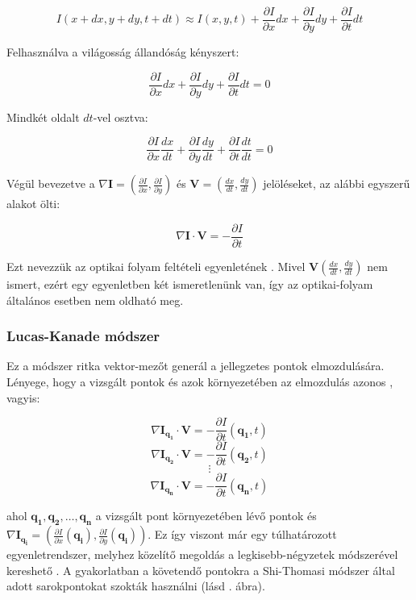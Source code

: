 \[I(x+dx, y+dy, t+dt) \approx I(x, y, t) + \frac{\partial I}{\partial x} dx + \frac{\partial I}{\partial y} dy + \frac{\partial I}{\partial t} dt\]

Felhasználva a világosság állandóság kényszert:

\[\frac{\partial I}{\partial x} dx + \frac{\partial I}{\partial y} dy + \frac{\partial I}{\partial t} dt = 0\]

Mindkét oldalt $dt$-vel osztva:

\[\frac{\partial I}{\partial x} \frac{dx}{dt} + \frac{\partial I}{\partial y} \frac{dy}{dt} + \frac{\partial I}{\partial t} \frac{dt}{dt} = 0\]

Végül bevezetve a $\nabla \mathbf{I} = \left(\frac{\partial I}{\partial x}, \frac{\partial I}{\partial y}\right)$ és $\mathbf{V} = \left(\frac{dx}{dt}, \frac{dy}{dt}\right)$ jelöléseket, az alábbi egyszerű alakot ölti:

\[\nabla \mathbf{I} \cdot \mathbf{V} = -\frac{\partial I}{\partial t}\]

Ezt nevezzük az optikai folyam feltételi egyenletének \cite{phd}. Mivel $\mathbf{V}\left(\frac{dx}{dt}, \frac{dy}{dt}\right)$ nem ismert, ezért egy egyenletben két ismeretlenünk van, így az optikai-folyam általános esetben nem oldható meg.

\subsubsection{Lucas-Kanade módszer \cite{LK}}

Ez a módszer ritka vektor-mezőt generál a jellegzetes pontok elmozdulására. Lényege, hogy a vizsgált pontok és azok környezetében az elmozdulás azonos \cite{lk-wiki}, vagyis:

\[\nabla \mathbf{I}_{\mathbf{q_1}} \cdot \mathbf{V} = -\frac{\partial I}{\partial t}(\mathbf{q_1}, t)\]
\[\nabla \mathbf{I}_{\mathbf{q_2}} \cdot \mathbf{V} = -\frac{\partial I}{\partial t}(\mathbf{q_2}, t)\]
\[\vdots\]
\[\nabla \mathbf{I}_{\mathbf{q_n}} \cdot \mathbf{V} = -\frac{\partial I}{\partial t}(\mathbf{q_n}, t)\]

ahol $\mathbf{q_1},\mathbf{q_2},\ldots,\mathbf{q_n}$ a vizsgált pont környezetében lévő pontok és $\nabla \mathbf{I}_{\mathbf{q_i}} = \left(\frac{\partial I}{\partial x}(\mathbf{q_i}), \frac{\partial I}{\partial y}(\mathbf{q_i})\right)$. Ez így viszont már egy túlhatározott egyenletrendszer, melyhez közelítő megoldás a legkisebb-négyzetek módszerével kereshető \cite{LK, lk-wiki}. A gyakorlatban a követendő pontokra a Shi-Thomasi \cite{shi-thomasi} módszer által adott sarokpontokat szokták használni (lásd . ábra).


